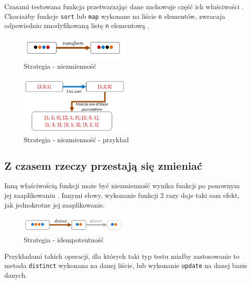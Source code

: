 Czasami testowana funkcja przetwarzając dane zachowuje część ich właściwości . 
Chociażby funkcje \texttt{sort} lub \texttt{map} wykonane na liście \texttt{n} elementów, zwracaja odpowiednio zmodyfikowaną listę \texttt{n} elementową .

\begin{figure}
    \centering
    \includegraphics[width=0.5\textwidth]{images/property_invariant.png}
    \caption{Strategia - niezmienność}
    \label{fig:invariant_strategy}
\end{figure}

\begin{figure}
    \centering
    \includegraphics[width=0.5\textwidth]{images/property_list_sort_permutation.png}
    \caption{Strategia - niezmienność - przykład}
    \label{fig:invariant_strategy_example}
\end{figure}

\subsection{Z czasem rzeczy przestają się zmieniać}

Inną właściwością funkcji może być niezmienność wyniku funkcji po ponownym jej zaaplikowaniu . 
Innymi słowy, wykonanie funkcji 2 razy daje taki sam efekt, jak jednokrotne jej zaaplikowanie.

\begin{figure}
    \centering
    \includegraphics[width=0.5\textwidth]{images/property_idempotence.png}
    \caption{Strategia - idempotentność}
    \label{fig:independance_strategy}
\end{figure}

Przykładami takich operacji, dla których taki typ testu miałby zastosowanie to metoda \texttt{distinct} wykonana na danej liście, lub wykonanie \texttt{update} na danej bazie danych.

